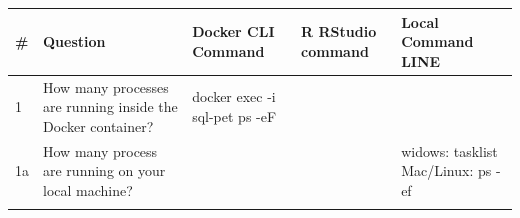 \documentclass[]{book}
\theoremstyle{definition}
\theoremstyle{definition}
\theoremstyle{definition}
\theoremstyle{remark}
\begin{document}
\begin{longtable}[]{@{}lllll@{}}
\toprule
\begin{minipage}[b]{0.02\columnwidth}\raggedright
\#\strut
\end{minipage} & \begin{minipage}[b]{0.19\columnwidth}\raggedright
Question\strut
\end{minipage} & \begin{minipage}[b]{0.29\columnwidth}\raggedright
Docker CLI Command\strut
\end{minipage} & \begin{minipage}[b]{0.20\columnwidth}\raggedright
R RStudio command\strut
\end{minipage} & \begin{minipage}[b]{0.16\columnwidth}\raggedright
Local Command LINE\strut
\end{minipage}\tabularnewline
\midrule
\endhead
\begin{minipage}[t]{0.02\columnwidth}\raggedright
1\strut
\end{minipage} & \begin{minipage}[t]{0.19\columnwidth}\raggedright
How many processes are running inside the Docker container?\strut
\end{minipage} & \begin{minipage}[t]{0.29\columnwidth}\raggedright
docker exec -i sql-pet ps -eF\strut
\end{minipage} & \begin{minipage}[t]{0.20\columnwidth}\raggedright
\strut
\end{minipage}\tabularnewline
\begin{minipage}[t]{0.02\columnwidth}\raggedright
1a\strut
\end{minipage} & \begin{minipage}[t]{0.19\columnwidth}\raggedright
How many process are running on your local machine?\strut
\end{minipage} & \begin{minipage}[t]{0.29\columnwidth}\raggedright
\strut
\end{minipage} & \begin{minipage}[t]{0.20\columnwidth}\raggedright
\strut
\end{minipage} & \begin{minipage}[t]{0.16\columnwidth}\raggedright
widows: tasklist Mac/Linux: ps -ef\strut
\end{minipage}\tabularnewline
\begin{minipage}[t]{0.02\columnwidth}\raggedright

\end{minipage}
\end{longtable}
\end{document}
